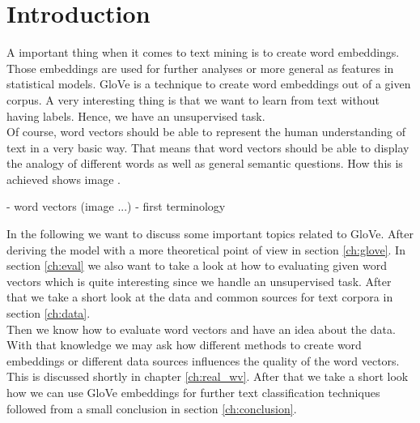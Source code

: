 \chapter{Introduction}

A important thing when it comes to text mining is to create word embeddings. Those embeddings
are used for further analyses or more general as features in statistical models. GloVe is a 
technique to create word embeddings out of a given corpus. A very interesting thing is that
we want to learn from text without having labels. Hence, we have an unsupervised task. \\

Of course, word vectors should be able to represent the human understanding of text in a very 
basic way. That means that word vectors should be able to display the analogy of different 
words as well as general semantic questions. How this is achieved shows image \label{fig:wv}. 


- word vectors (image ...)
- first terminology

In the following we want to discuss some important topics related to GloVe. After 
deriving the model with a more theoretical point of view in section \ref{ch:glove}. 
In section \ref{ch:eval} we also want to take a look at how to evaluating given word 
vectors which is quite interesting since we handle an unsupervised task. After that we 
take a short look at the data and common sources for text corpora in section \ref{ch:data}. \\

Then we know how to evaluate word vectors and have an idea about the data. With that 
knowledge we may ask how different methods to create word embeddings or different data 
sources influences the quality of the word vectors. This is discussed shortly in chapter
\ref{ch:real_wv}. After that we take a short look how we can use GloVe embeddings for
further text classification techniques followed from a small conclusion in section
\ref{ch:conclusion}.
